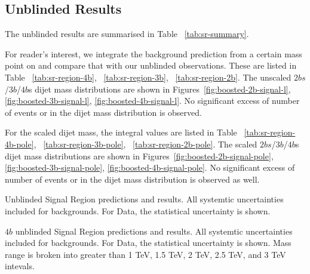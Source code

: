 \subsection{Unblinded Results}
The unblinded results are summarised in Table ~\ref{tab:sr-summary}. 

For reader's interest, we integrate the background prediction from a certain mass point on and compare that with our unblinded observations. These are listed in Table ~\ref{tab:sr-region-4b}, ~\ref{tab:sr-region-3b}, ~\ref{tab:sr-region-2b}. The unscaled $2bs$/$3b$/$4b$s dijet mass distributions are shown in Figures~\ref{fig:boosted-2b-signal-l}, \ref{fig:boosted-3b-signal-l}, \ref{fig:boosted-4b-signal-l}. No significant excess of number of events or in the dijet mass distribution is observed.

For the scaled dijet mass, the integral values are listed in Table ~\ref{tab:sr-region-4b-pole}, ~\ref{tab:sr-region-3b-pole}, ~\ref{tab:sr-region-2b-pole}. The scaled $2bs$/$3b$/$4b$s dijet mass distributions are shown in Figures~\ref{fig:boosted-2b-signal-pole}, \ref{fig:boosted-3b-signal-pole}, \ref{fig:boosted-4b-signal-pole}. No significant excess of number of events or in the dijet mass distribution is observed as well.


\begin{table}[htbp!]
\scriptsize
\begin{center}

\caption{Unblinded Signal Region predictions and results. All systemtic uncertainties included for backgrounds. For Data, the statistical uncertainty is shown.}
\label{tab:sr-summary}
\end{center}
\end{table}

\begin{table}[htbp!]
\scriptsize
\begin{center}

\caption{$4b$ unblinded Signal Region predictions and results. All systemtic uncertainties included for backgrounds. For Data, the statistical uncertainty is shown. Mass range is broken into greater than 1 TeV, 1.5 TeV, 2 TeV, 2.5 TeV, and 3 TeV intevals.}
\label{tab:sr-region-4b}
\end{center}
\end{table}

